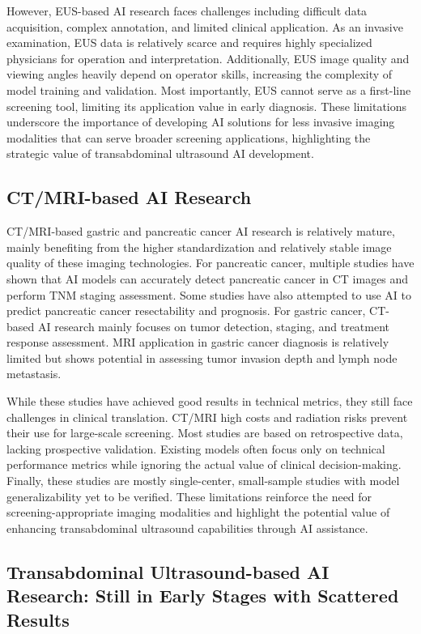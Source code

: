 However, EUS-based AI research faces challenges including difficult data acquisition, complex annotation, and limited clinical application. As an invasive examination, EUS data is relatively scarce and requires highly specialized physicians for operation and interpretation. Additionally, EUS image quality and viewing angles heavily depend on operator skills, increasing the complexity of model training and validation. Most importantly, EUS cannot serve as a first-line screening tool, limiting its application value in early diagnosis. These limitations underscore the importance of developing AI solutions for less invasive imaging modalities that can serve broader screening applications, highlighting the strategic value of transabdominal ultrasound AI development.

\subsection{CT/MRI-based AI Research}

CT/MRI-based gastric and pancreatic cancer AI research is relatively mature, mainly benefiting from the higher standardization and relatively stable image quality of these imaging technologies. For pancreatic cancer, multiple studies have shown that AI models can accurately detect pancreatic cancer in CT images and perform TNM staging assessment. Some studies have also attempted to use AI to predict pancreatic cancer resectability and prognosis. For gastric cancer, CT-based AI research mainly focuses on tumor detection, staging, and treatment response assessment. MRI application in gastric cancer diagnosis is relatively limited but shows potential in assessing tumor invasion depth and lymph node metastasis.

While these studies have achieved good results in technical metrics, they still face challenges in clinical translation. CT/MRI high costs and radiation risks prevent their use for large-scale screening. Most studies are based on retrospective data, lacking prospective validation. Existing models often focus only on technical performance metrics while ignoring the actual value of clinical decision-making. Finally, these studies are mostly single-center, small-sample studies with model generalizability yet to be verified. These limitations reinforce the need for screening-appropriate imaging modalities and highlight the potential value of enhancing transabdominal ultrasound capabilities through AI assistance.

\subsection{Transabdominal Ultrasound-based AI Research: Still in Early Stages with Scattered Results}

